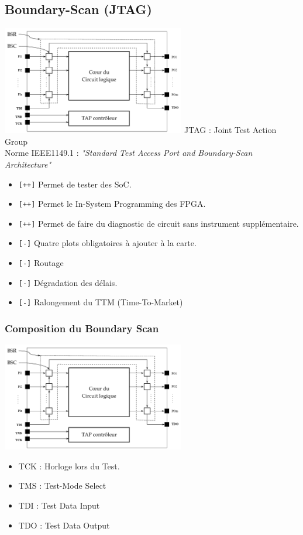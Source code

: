 \documentclass[10pt]{article}
\begin{document}
\begin{multicols}{2}
  \subsection{Boundary-Scan (JTAG)}
  \includegraphics[width=8cm]{jtag1.png}
  JTAG : Joint Test Action Group\\
  Norme IEEE1149.1 : \textit{"Standard Test Access Port and Boundary-Scan
  Architecture"}
  \begin{itemize}
    \itemsep0em
    \item \texttt{[++]} Permet de tester des SoC.
    \item \texttt{[++]} Permet le In-System Programming des FPGA.
    \item \texttt{[++]} Permet de faire du diagnostic de circuit sans instrument
    supplémentaire.
    \item \texttt{[-]} Quatre plots obligatoires à ajouter à la carte.
    \item \texttt{[-]} Routage
    \item \texttt{[-]} Dégradation des délais.
    \item \texttt{[-]} Ralongement du TTM (Time-To-Market)
  \end{itemize}
  \newpage
  \subsubsection{Composition du Boundary Scan}
  \includegraphics[width=8cm]{jtag1.png}
  \begin{itemize}
    \itemsep0em
    \item TCK : Horloge lors du Test.
    \item TMS : Test-Mode Select
    \item TDI : Test Data Input
    \item TDO : Test Data Output
  \end{itemize}

\end{multicols}
\end{document}
